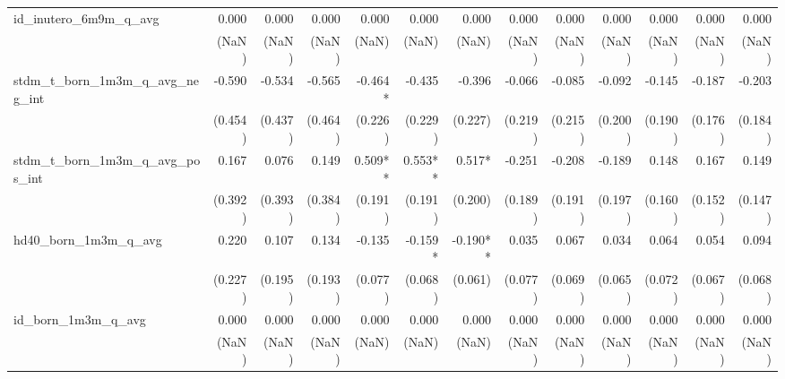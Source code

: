 \begin{tabular}{lrrrrrrrrrrrr}
id\_inutero\_6m9m\_q\_avg                   &        0.000 &        0.000 &        0.000 &        0.000 &        0.000 &        0.000 &        0.000 &        0.000 &        0.000 &        0.000 &        0.000 &        0.000 \\ 
                                            &        (NaN) &        (NaN) &        (NaN) &        (NaN) &        (NaN) &        (NaN) &        (NaN) &        (NaN) &        (NaN) &        (NaN) &        (NaN) &        (NaN) \\ 
stdm\_t\_born\_1m3m\_q\_avg\_neg\_int       &       -0.590 &       -0.534 &       -0.565 &      -0.464* &       -0.435 &       -0.396 &       -0.066 &       -0.085 &       -0.092 &       -0.145 &       -0.187 &       -0.203 \\ 
                                            &      (0.454) &      (0.437) &      (0.464) &      (0.226) &      (0.229) &      (0.227) &      (0.219) &      (0.215) &      (0.200) &      (0.190) &      (0.176) &      (0.184) \\ 
stdm\_t\_born\_1m3m\_q\_avg\_pos\_int       &        0.167 &        0.076 &        0.149 &      0.509** &      0.553** &       0.517* &       -0.251 &       -0.208 &       -0.189 &        0.148 &        0.167 &        0.149 \\ 
                                            &      (0.392) &      (0.393) &      (0.384) &      (0.191) &      (0.191) &      (0.200) &      (0.189) &      (0.191) &      (0.197) &      (0.160) &      (0.152) &      (0.147) \\ 
hd40\_born\_1m3m\_q\_avg                    &        0.220 &        0.107 &        0.134 &       -0.135 &      -0.159* &     -0.190** &        0.035 &        0.067 &        0.034 &        0.064 &        0.054 &        0.094 \\ 
                                            &      (0.227) &      (0.195) &      (0.193) &      (0.077) &      (0.068) &      (0.061) &      (0.077) &      (0.069) &      (0.065) &      (0.072) &      (0.067) &      (0.068) \\ 
id\_born\_1m3m\_q\_avg                      &        0.000 &        0.000 &        0.000 &        0.000 &        0.000 &        0.000 &        0.000 &        0.000 &        0.000 &        0.000 &        0.000 &        0.000 \\ 
                                            &        (NaN) &        (NaN) &        (NaN) &        (NaN) &        (NaN) &        (NaN) &        (NaN) &        (NaN) &        (NaN) &        (NaN) &        (NaN) &        (NaN) \\ 

\end{tabular}
